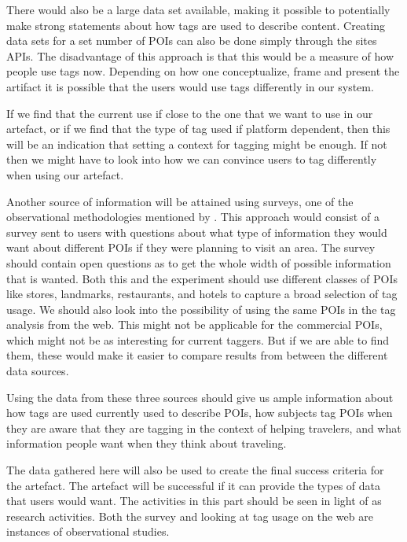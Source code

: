 There would also be a large data set available, making it possible to potentially make strong statements about how tags are used to describe content.
Creating data sets for a set number of POIs can also be done simply through the sites APIs.
The disadvantage of this approach is that this would be a measure of how people use tags now. 
Depending on how one conceptualize, frame and present the artifact it is possible that the users would use tags differently in our system.

If we find that the current use if close to the one that we want to use in our artefact, 
or if we find that the type of tag used if platform dependent, 
then this will be an indication that setting a context for tagging might be enough.
If not then we might have to look into how we can convince users to tag differently when using our artefact.


Another source of information will be attained using surveys, one of the observational methodologies mentioned by \citet{Chen1990}.
This approach would consist of a survey sent to users with questions about what type of information they would want about different POIs if they were planning to visit an area.
The survey should contain open questions as to get the whole width of possible information that is wanted.
Both this and the experiment should use different classes of POIs like stores, landmarks, restaurants, and hotels to capture a broad selection of tag usage. 
We should also look into the possibility of using the same POIs in the tag analysis from the web. 
This might not be applicable for the commercial POIs, which might not be as interesting for current taggers. 
But if we are able to find them, these would make it easier to compare results from between the different data sources.

Using the data from these three sources should give us ample information about how tags are used currently used to describe POIs, 
how subjects tag POIs when they are aware that they are tagging in the context of helping travelers, 
and what information people want when they think about traveling. 

The data gathered here will also be used to create the final success criteria for the artefact. 
The artefact will be successful if it can provide the types of data that users would want. 
The activities in this part should be seen in light of \citet{Chen1990} as research activities. 
Both the survey and looking at tag usage on the web are instances of observational studies.




